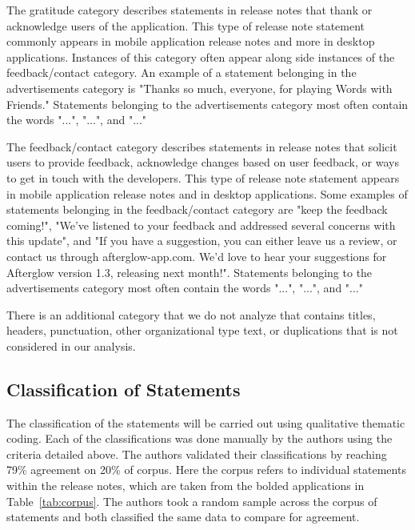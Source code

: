 \documentclass{acm_proc_article-sp}
\begin{document}

The gratitude category describes statements in release notes that thank or acknowledge users of the application.
This type of release note statement commonly appears in mobile application release notes and more  in desktop applications.
Instances of this category often appear along side instances of the feedback/contact category.
An example of a statement belonging in the advertisements category is "Thanks so much, everyone, for playing Words with Friends."
Statements belonging to the advertisements category most often contain the words "...", "...", and "..." 

The feedback/contact category describes statements in release notes that solicit users to provide feedback, acknowledge changes based on user feedback, or ways to get in touch with the developers.
This type of release note statement appears in mobile application release notes and  in desktop applications.
Some examples of statements belonging in the feedback/contact category are "keep the feedback coming!", "We've listened to your feedback and addressed several concerns with this update", and  "If you have a suggestion, you can either leave us a review, or contact us through afterglow-app.com. We'd love to hear your suggestions for Afterglow version 1.3, releasing next month!".
Statements belonging to the advertisements category most often contain the words "...", "...", and "..." 

There is an additional category that we do not analyze that contains titles, headers, punctuation, other organizational type text, or duplications that is not considered in our analysis.

\subsection{Classification of Statements}
The classification of the statements will be carried out using qualitative thematic coding. 
Each of the classifications was done manually by the authors using the criteria detailed above.
The authors validated their classifications by reaching 79\% agreement on 20\% of corpus.
Here the corpus refers to individual statements within the release notes, which are taken from the bolded applications in Table~\ref{tab:corpus}.
The authors took a random sample across the corpus of statements and both classified the same data to compare for agreement. 
\end{document}
